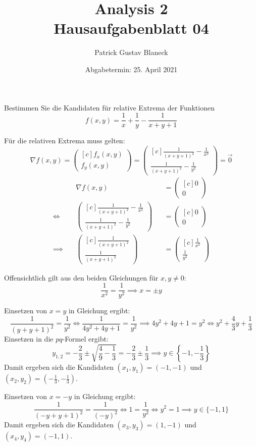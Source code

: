 \documentclass[answers]{exam}
\title{Analysis 2 \\ \large{Hausaufgabenblatt 04}}
\author{Patrick Gustav Blaneck}
\date{Abgabetermin: 25. April 2021}
\newcommand{\Rnum}[1]{\uppercase\expandafter{\romannumeral #1\relax}}
\newcommand{\vektor}[1]{\begin{pmatrix*}[c] #1 \end{pmatrix*}}
\begin{document}
\maketitle
\begin{questions}
    \question
    Bestimmen Sie die Kandidaten für relative Extrema der Funktionen
    $$
        f(x, y) = \frac{1}{x} + \frac{1}{y} - \frac{1}{x+y+1}
    $$
    \begin{solution}
        Für die relativen Extrema muss gelten:
        $$
            \nabla f(x, y) = \vektor{f_x(x, y) \\ f_y(x, y)} = \vektor{\frac{1}{(x+y+1)^2} - \frac{1}{x^2}  \\ \frac{1}{(x+y+1)^2}-\frac{1}{y^2} } = \vec{0}
        $$
        $$
            \begin{aligned}
                               & \nabla f(x, y)                              &  & = \vektor{0 \\ 0} \\
                \iff \quad     & \vektor{\frac{1}{(x+y+1)^2} - \frac{1}{x^2}                  \\ \frac{1}{(x+y+1)^2}-\frac{1}{y^2} } && = \vektor{0 \\ 0} \\
                \implies \quad & \vektor{\frac{1}{(x+y+1)^2}                                  \\ \frac{1}{(x+y+1)^2} } && = \vektor{\frac{1}{x^2}  \\ \frac{1}{y^2}}
            \end{aligned}
        $$

        Offensichtlich gilt aus den beiden Gleichungen für $x, y \neq 0$:
        $$
            \frac{1}{x^2} = \frac{1}{y^2} \implies x = \pm y
        $$

        Einsetzen von $x = y$ in Gleichung \Rnum{1} ergibt:
        $$
            \frac{1}{(y+y+1)^2} = \frac{1}{y^2} \iff \frac{1}{4y^2 + 4y + 1} = \frac{1}{y^2} \implies 4y^2 + 4y + 1 = y^2 \iff y^2 + \frac{4}{3}y + \frac{1}{3}
        $$
        Einsetzen in die $pq$-Formel ergibt:
        $$
            y_{1, 2} = -\frac{2}{3} \pm \sqrt{\frac{4}{9} - \frac{1}{3}} = -\frac{2}{3} \pm \frac{1}{3} \implies y \in \left\{ -1, -\frac{1}{3} \right\}
        $$
        Damit ergeben sich die Kandidaten $(x_1, y_1) = (-1, -1)$ und $(x_2, y_2) = (-\frac{1}{3}, -\frac{1}{3})$.

        Einsetzen von $x = -y$ in Gleichung \Rnum{2} ergibt:
        $$
            \frac{1}{(-y+y+1)^2} = \frac{1}{(-y)^2} \iff 1 = \frac{1}{y^2} \iff y^2 = 1 \implies y \in \{ -1, 1 \}
        $$
        Damit ergeben sich die Kandidaten $(x_3, y_3) = (1, -1)$ und $(x_4, y_4) = (-1, 1)$.
    \end{solution}


\end{questions}
\end{document}
